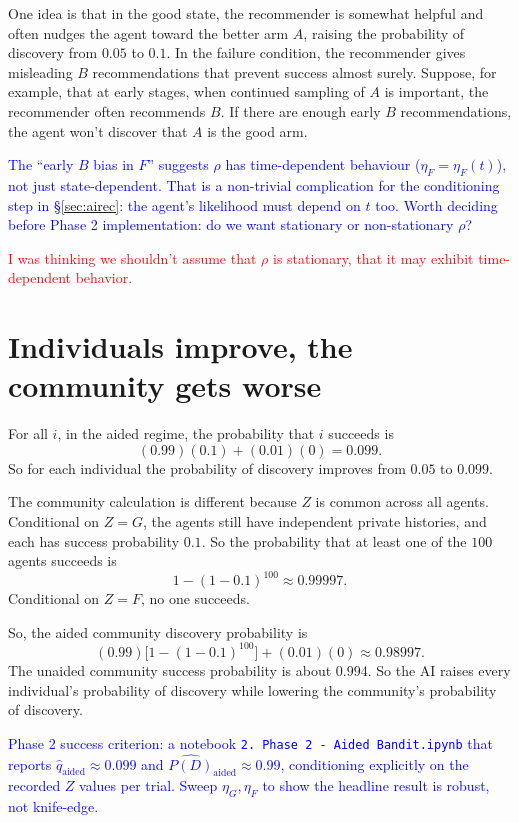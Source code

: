 \documentclass[12pt]{article}
\newcommand{\ignacio}[1]{\textcolor{blue}{#1}}
\newcommand{\michael}[1]{\textcolor{red}{#1}}
\begin{document}
One idea is that in the good state, the recommender is somewhat helpful and often nudges the agent toward the better arm $A$, raising the probability of discovery from $0.05$ to $0.1$.
In the failure condition, the recommender gives misleading $B$ recommendations that prevent success almost surely.
Suppose, for example, that at early stages, when continued sampling of $A$ is important, the recommender often recommends $B$.
If there are enough early $B$ recommendations, the agent won't discover that $A$ is the good arm.

\ignacio{The ``early $B$ bias in $F$'' suggests $\rho$ has time-dependent behaviour ($\eta_F = \eta_F(t)$), not just state-dependent. That is a non-trivial complication for the conditioning step in \S\ref{sec:airec}: the agent's likelihood must depend on $t$ too. Worth deciding before Phase 2 implementation: do we want stationary or non-stationary $\rho$?}

\michael{I was thinking we shouldn't assume that $\rho$ is stationary, that it may exhibit time-dependent behavior.}

\section{Individuals improve, the community gets worse}
\label{sec:improve}

For all $i$, in the aided regime, the probability that $i$ succeeds is
\[
  (0.99)(0.1) + (0.01)(0) = 0.099.
\]
So for each individual the probability of discovery improves from $0.05$ to $0.099$.

The community calculation is different because $Z$ is common across all agents.
Conditional on $Z = G$, the agents still have independent private histories, and each has success probability $0.1$.
So the probability that at least one of the $100$ agents succeeds is
\[
  1 - (1 - 0.1)^{100} \approx 0.99997.
\]
Conditional on $Z = F$, no one succeeds.

So, the aided community discovery probability is
\[
  (0.99)\bigl[1 - (1 - 0.1)^{100}\bigr] + (0.01)(0) \approx 0.98997.
\]
The unaided community success probability is about $0.994$.
So the AI raises every individual's probability of discovery while lowering the community's probability of discovery.

\ignacio{Phase 2 success criterion: a notebook \texttt{2.\ Phase 2 - Aided Bandit.ipynb} that reports $\hat q_{\text{aided}} \approx 0.099$ and $\widehat{P(D)}_{\text{aided}} \approx 0.99$, conditioning explicitly on the recorded $Z$ values per trial. Sweep $\eta_G, \eta_F$ to show the headline result is robust, not knife-edge.}
\end{document}
